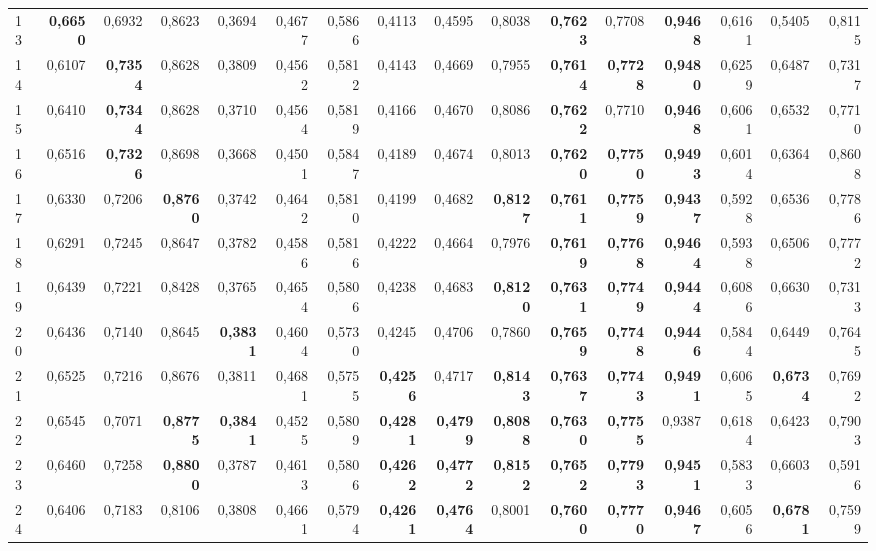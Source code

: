 \begin{table}[htp!]
\begin{adjustwidth}{-2cm}{}
\begin{tabular}{ l | *{15}{| r}}
13	&	\textbf{0,6650}	&	0,6932	&	0,8623	&	0,3694	&	0,4677	&	0,5866	&	0,4113	&	0,4595	&	0,8038	&	\textbf{0,7623}	&	0,7708	&	\textbf{0,9468}	&	0,6161	&	0,5405	&	0,8115	\\
14	&	0,6107	&	\textbf{0,7354}	&	0,8628	&	0,3809	&	0,4562	&	0,5812	&	0,4143	&	0,4669	&	0,7955	&	\textbf{0,7614}	&	\textbf{0,7728}	&	\textbf{0,9480}	&	0,6259	&	0,6487	&	0,7317	\\
15	&	0,6410	&	\textbf{0,7344}	&	0,8628	&	0,3710	&	0,4564	&	0,5819	&	0,4166	&	0,4670	&	0,8086	&	\textbf{0,7622}	&	0,7710	&	\textbf{0,9468}	&	0,6061	&	0,6532	&	0,7710	\\
16	&	0,6516	&	\textbf{0,7326}	&	0,8698	&	0,3668	&	0,4501	&	0,5847	&	0,4189	&	0,4674	&	0,8013	&	\textbf{0,7620}	&	\textbf{0,7750}	&	\textbf{0,9493}	&	0,6014	&	0,6364	&	0,8608	\\
17	&	0,6330	&	0,7206	&	\textbf{0,8760}	&	0,3742	&	0,4642	&	0,5810	&	0,4199	&	0,4682	&	\textbf{0,8127}	&	\textbf{0,7611}	&	\textbf{0,7759}	&	\textbf{0,9437}	&	0,5928	&	0,6536	&	0,7786	\\
18	&	0,6291	&	0,7245	&	0,8647	&	0,3782	&	0,4586	&	0,5816	&	0,4222	&	0,4664	&	0,7976	&	\textbf{0,7619}	&	\textbf{0,7768}	&	\textbf{0,9464}	&	0,5938	&	0,6506	&	0,7772	\\
19	&	0,6439	&	0,7221	&	0,8428	&	0,3765	&	0,4654	&	0,5806	&	0,4238	&	0,4683	&	\textbf{0,8120}	&	\textbf{0,7631}	&	\textbf{0,7749}	&	\textbf{0,9444}	&	0,6086	&	0,6630	&	0,7313	\\
20	&	0,6436	&	0,7140	&	0,8645	&	\textbf{0,3831}	&	0,4604	&	0,5730	&	0,4245	&	0,4706	&	0,7860	&	\textbf{0,7659}	&	\textbf{0,7748}	&	\textbf{0,9446}	&	0,5844	&	0,6449	&	0,7645	\\
21	&	0,6525	&	0,7216	&	0,8676	&	0,3811	&	0,4681	&	0,5755	&	\textbf{0,4256}	&	0,4717	&	\textbf{0,8143}	&	\textbf{0,7637}	&	\textbf{0,7743}	&	\textbf{0,9491}	&	0,6065	&	\textbf{0,6734}	&	0,7692	\\
22	&	0,6545	&	0,7071	&	\textbf{0,8775}	&	\textbf{0,3841}	&	0,4525	&	0,5809	&	\textbf{0,4281}	&	\textbf{0,4799}	&	\textbf{0,8088}	&	\textbf{0,7630}	&	\textbf{0,7755}	&	0,9387	&	0,6184	&	0,6423	&	0,7903	\\
23	&	0,6460	&	0,7258	&	\textbf{0,8800}	&	0,3787	&	0,4613	&	0,5806	&	\textbf{0,4262}	&	\textbf{0,4772}	&	\textbf{0,8152}	&	\textbf{0,7652}	&	\textbf{0,7793}	&	\textbf{0,9451}	&	0,5833	&	0,6603	&	0,5916	\\
24	&	0,6406	&	0,7183	&	0,8106	&	0,3808	&	0,4661	&	0,5794	&	\textbf{0,4261}	&	\textbf{0,4764}	&	0,8001	&	\textbf{0,7600}	&	\textbf{0,7770}	&	\textbf{0,9467}	&	0,6056	&	\textbf{0,6781}	&	0,7599	\\

\end{tabular}
\end{adjustwidth}
\end{table}
